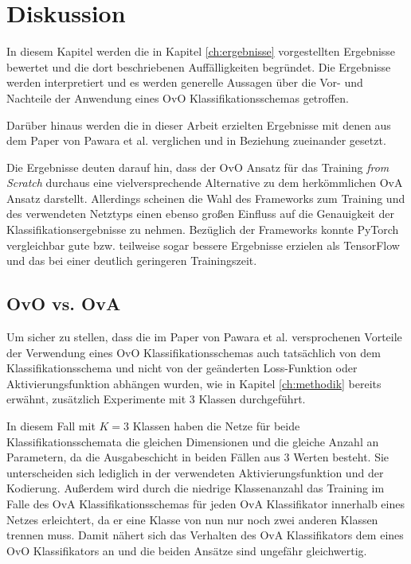 \chapter{Diskussion}
\label{ch:diskussion}
In diesem Kapitel werden die in Kapitel \ref{ch:ergebnisse} vorgestellten Ergebnisse bewertet und die dort beschriebenen Auffälligkeiten begründet. Die Ergebnisse werden interpretiert und es werden generelle Aussagen über die Vor- und Nachteile der Anwendung eines OvO Klassifikationsschemas getroffen.

Darüber hinaus werden die in dieser Arbeit erzielten Ergebnisse mit denen aus dem Paper von Pawara et al. \cite{pawaraPaper} verglichen und in Beziehung zueinander gesetzt.

Die Ergebnisse deuten darauf hin, dass der OvO Ansatz für das Training \textit{from Scratch} durchaus eine vielversprechende Alternative zu dem herkömmlichen OvA Ansatz darstellt. Allerdings scheinen die Wahl des Frameworks zum Training und des verwendeten Netztyps einen ebenso großen Einfluss auf die Genauigkeit der Klassifikationsergebnisse zu nehmen. Bezüglich der Frameworks konnte PyTorch \cite{pytorch} vergleichbar gute bzw. teilweise sogar bessere Ergebnisse erzielen als TensorFlow \cite{tensorflow} und das bei einer deutlich geringeren Trainingszeit.


\section{OvO vs. OvA}
\label{ch:diskussionOvOvsOvA}
Um sicher zu stellen, dass die im Paper von Pawara et al. \cite{pawaraPaper} versprochenen Vorteile der Verwendung eines OvO Klassifikationsschemas auch tatsächlich von dem Klassifikationsschema und nicht von der geänderten Loss-Funktion oder Aktivierungsfunktion abhängen wurden, wie in Kapitel \ref{ch:methodik} bereits erwähnt, zusätzlich Experimente mit 3 Klassen durchgeführt.


In diesem Fall mit $K=3$ Klassen haben die Netze für beide Klassifikationsschemata die gleichen Dimensionen und die gleiche Anzahl an Parametern, da die Ausgabeschicht in beiden Fällen aus $3$ Werten besteht. Sie unterscheiden sich lediglich in der verwendeten Aktivierungsfunktion und der Kodierung. Außerdem wird durch die niedrige Klassenanzahl das Training im Falle des OvA Klassifikationsschemas für jeden OvA Klassifikator innerhalb eines Netzes erleichtert, da er eine Klasse von nun nur noch zwei anderen Klassen trennen muss. Damit nähert sich das Verhalten des OvA Klassifikators dem eines OvO Klassifikators an und die beiden Ansätze sind ungefähr gleichwertig.


